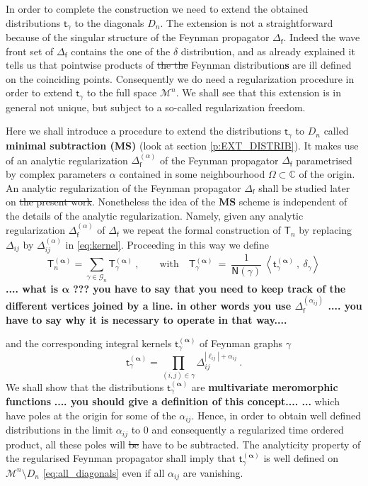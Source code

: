 \documentclass[11pt]{book}
\newcommand{\com}[1]{{\color{red}\bf #1}}
\newcommand{\sbar}[1]{\sout{\color{red} #1}}
\newcommand{\MS}{\textbf{MS}}
\newcommand{\alphabd}{\boldsymbol{\alpha}}
\newcommand{\abs}[1]{\left|#1\right|}
\newcommand{\sm}[1]{\left\langle#1\right\rangle}
\newcommand{\Gcal}{\mathcal{G}}
\newcommand{\Mcal}{\mathcal{M}}
\newcommand{\Cbb}{\mathbb{C}}
\newcommand{\Nsf}{\mathsf{N}}
\newcommand{\Tsf}{\mathsf{T}}
\newcommand{\fsf}{\mathsf{f}}
\newcommand{\tsf}{\mathsf{t}}
\theoremstyle{break}
\begin{document}
In order to complete the construction we need to extend the obtained distributions $\tsf_\gamma$ to the diagonals $D_n$. The extension is not a straightforward because of the singular structure of the Feynman propagator $\Delta_\fsf$. Indeed the wave front set of $\Delta_\fsf$ contains the one of the $\delta$ distribution, and as already explained it tells us that pointwise products of \sbar{the the} Feynman distribution\com{s} are ill defined on the coinciding points. Consequently we do need a regularization procedure in order to extend $\tsf_\gamma$ to the full space $\Mcal^n$. We shall see that this extension is in general not unique, but subject to a so-called regularization freedom.


\bigskip

Here we shall introduce a procedure to extend the distributions $\tsf_\gamma$ to $D_n$ called \textbf{minimal subtraction (MS)} (look at section \ref{p:EXT_DISTRIB}). It makes use of an analytic regularization $\Delta_\fsf^{(\alpha)}$ of the Feynman propagator $\Delta_\fsf$ parametrised by complex parameters $\alpha$ contained in some neighbourhood $\Omega \subset \Cbb$ of the origin. An analytic regularization of the Feynman propagator $\Delta_\fsf$ shall be studied later on \sbar{the present work}. Nonetheless the idea of the $\MS$ scheme is independent of the details of the analytic regularization. Namely, given any analytic regularization $\Delta^{(\alpha)}_\fsf$ of $\Delta_\fsf$ we repeat the formal construction of $\Tsf_n$ by replacing $\Delta_{ij}$ by $\Delta^{(\alpha)}_{ij}$ in \eqref{eq:kernel}. Proceeding in this way we define 
%
\begin{equation}
\Tsf_n^{(\alphabd)} = \sum_{\gamma \in \Gcal_n} \Tsf_\gamma^{(\alphabd)} \ , \qquad \mbox{with} \quad \Tsf_\gamma^{(\alphabd)} \ = \ \frac{1}{\Nsf(\gamma)} \ \sm{\tsf_\gamma^{(\alphabd)} \ , \ \delta_\gamma}
\label{eq:time_ordered_prod_graph_reg}
\end{equation}
\com{ .... what is $\alphabd$ ??? you have to say that you need to keep track of the different vertices joined by a line. in other words you use $\Delta^{(\alpha_{ij})}_\fsf$  .... you have to say why it is necessary to operate in that way....}


%
and the corresponding integral kernels $\tsf^{(\alphabd)}_\gamma$ of Feynman graphs $\gamma$ 
%
\begin{equation}
\tsf^{(\alphabd)}_\gamma = \prod_{(i,j) \in \gamma} \Delta_{ij}^{\abs{\ell_{ij}}+\alpha_{ij}} \ .
\label{eq:kernel_reg}
\end{equation}
%
We shall show that the distributions $\tsf^{(\alphabd)}_\gamma$ are \textbf{multivariate meromorphic functions} \com{.... you should give a definition of this concept.... ...} which have poles at the origin for some of the $\alpha_{ij}$. Hence, in order to obtain well defined distributions in the limit $\alpha_{ij}$ to $0$ and consequently a regularized time ordered product, all these poles will \sbar{be} have to be subtracted. The analyticity property of the regularised Feynman propagator shall imply that $\tsf^{(\alphabd)}_\gamma$ is well defined on $ \Mcal^n \setminus D_n $ \eqref{eq:all_diagonals} even if all $\alpha_{ij}$ are vanishing. 
\end{document}
